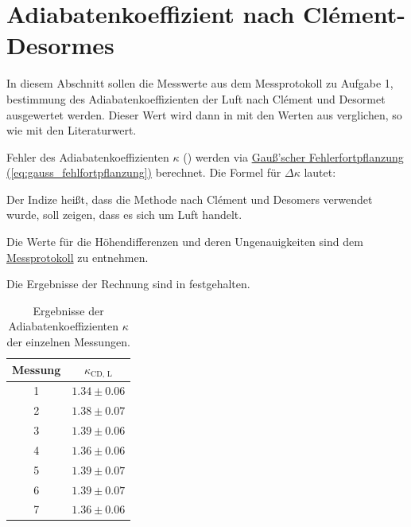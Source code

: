\newpage%
\newpage
\section{Adiabatenkoeffizient nach Clément-Desormes}
\label{sec:A1}

In diesem Abschnitt sollen die Messwerte aus dem Messprotokoll zu Aufgabe 1, bestimmung des Adiabatenkoeffizienten der Luft nach Clément und Desormet ausgewertet werden. Dieser Wert wird dann in  mit den Werten aus  verglichen, so wie mit den Literaturwert.
\newline

Fehler des Adiabatenkoeffizienten \(\kappa\) () werden via \hyperref[eq:gauss_fehlfortpflanzung]{Gauß'scher Fehlerfortpflanzung (\ref*{eq:gauss_fehlfortpflanzung})} berechnet. Die Formel für \(\Delta\kappa\) lautet:


Der  Indize  heißt, dass die Methode nach Clément und Desomers verwendet wurde,  soll zeigen, dass es sich um Luft handelt.

Die Werte für die Höhendifferenzen und deren Ungenauigkeiten sind dem \hyperref[ch:Protokoll]{Messprotokoll} zu entnehmen.

Die Ergebnisse der Rechnung sind in  festgehalten.

\begin{table}[h]
    \centering
    \caption{Ergebnisse der Adiabatenkoeffizienten $\kappa$ der einzelnen Messungen.}
    \label{tab:kappaA1}
    \begin{tabular}{c | c}
        \toprule
        Messung & $\kappa_\text{CD, L}$ \\
        \midrule
        1 & $1.34 \pm 0.06$ \\
        2 & $1.38 \pm 0.07$ \\
        3 & $1.39 \pm 0.06$ \\
        4 & $1.36 \pm 0.06$ \\
        5 & $1.39 \pm 0.07$ \\
        6 & $1.39 \pm 0.07$ \\
        7 & $1.36 \pm 0.06$ \\
        \bottomrule
    \end{tabular}
\end{table}


